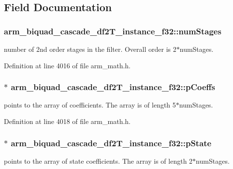 \subsection{Field Documentation}
\hypertarget{structarm__biquad__cascade__df2_t__instance__f32_a4d17958c33c3d0a905f974bac50f033f}{
\subsubsection[{num\-Stages}]{ arm\-\_\-biquad\-\_\-cascade\-\_\-df2\-T\-\_\-instance\-\_\-f32\-::num\-Stages}}\label{structarm__biquad__cascade__df2_t__instance__f32_a4d17958c33c3d0a905f974bac50f033f}
number of 2nd order stages in the filter. Overall order is 2$\ast$num\-Stages. 

Definition at line 4016 of file arm\-\_\-math.\-h.

\hypertarget{structarm__biquad__cascade__df2_t__instance__f32_a49a24fe1b6ad3b0b26779c32d8d80b2e}{
\subsubsection[{p\-Coeffs}]{$\ast$ arm\-\_\-biquad\-\_\-cascade\-\_\-df2\-T\-\_\-instance\-\_\-f32\-::p\-Coeffs}}\label{structarm__biquad__cascade__df2_t__instance__f32_a49a24fe1b6ad3b0b26779c32d8d80b2e}
points to the array of coefficients. The array is of length 5$\ast$num\-Stages. 

Definition at line 4018 of file arm\-\_\-math.\-h.

\hypertarget{structarm__biquad__cascade__df2_t__instance__f32_a24d223addfd926a7177088cf2efe76b1}{
\subsubsection[{p\-State}]{$\ast$ arm\-\_\-biquad\-\_\-cascade\-\_\-df2\-T\-\_\-instance\-\_\-f32\-::p\-State}}\label{structarm__biquad__cascade__df2_t__instance__f32_a24d223addfd926a7177088cf2efe76b1}
points to the array of state coefficients. The array is of length 2$\ast$num\-Stages. 

